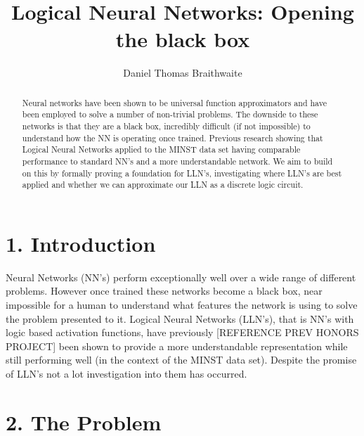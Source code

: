 \documentclass[11pt, a4paper, twoside, openright]{report}
\title{Logical Neural Networks: Opening the black box}
\author{Daniel Thomas Braithwaite}
\date{}
\begin{document}
\frontmatter


\begin{abstract}
Neural networks have been shown to be universal function approximators  and have been employed to solve a number of non-trivial problems. The downside to these networks is that they are a black box, incredibly difficult (if not impossible) to understand how the NN is operating once trained. Previous research showing that Logical Neural Networks applied to the MINST data set having comparable performance to standard NN's and a more understandable network. We aim to build on this by formally proving a foundation for LLN's, investigating where LLN's are best applied and whether we can approximate our LLN as a discrete logic circuit.
\end{abstract}


\maketitle




\mainmatter


\section*{1. Introduction}

Neural Networks (NN's) perform exceptionally well over a wide range of different problems. However once trained these networks become a black box, near impossible for a human to understand what features the network is using to solve the problem presented to it. Logical Neural Networks (LLN's), that is NN's with logic based activation functions, have previously [REFERENCE PREV HONORS PROJECT] been shown to provide a more understandable representation while still performing well (in the context of the MINST data set). Despite the promise of LLN's not a lot investigation into them has occurred.

\section*{2. The Problem}
\end{document}

